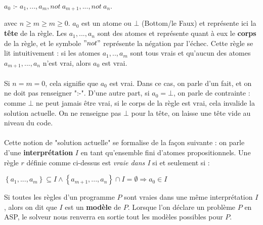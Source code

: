 \documentclass[12pt,a4paper]{article}
\begin{document}
\begin{center}
$a_0$ :- $a_1,...,a_m,not \: a_{m+1},...,not \: a_n.$
\end{center}
avec $n\geq m\geq m\geq 0$. $a_0$ est un atome ou $\bot$ (Bottom/le Faux) et représente ici la \textbf{tête} de la règle. Les $a_1,...,a_n$ sont des atomes et représente quant à eux le \textbf{corps} de la règle, et le symbole $"not"$ 
représente la négation par l'échec. Cette règle se lit intuitivement : si les atomes $a_1,..,a_m$ sont tous vrais et qu'aucun des atomes $a_{m+1},...,a_n$ n'est vrai, alors $a_0$ est vrai.\\ \\
Si $n=m=0$, cela signifie que $a_0$ est vrai. Dans ce cas, on parle d'un fait, et on ne doit pas renseigner ":-". D'une autre part, si $a_0=\bot$, on parle de contrainte : comme $\bot$ ne peut jamais être vrai, si le corps de la règle est vrai, cela 
invalide la solution actuelle. On ne renseigne pas $\bot$ pour la tête, on laisse une tête vide au niveau du code.\\ \\
Cette notion de "solution actuelle" se formalise de la façon suivante : on parle d'une \textbf{interprétation} $I$ en tant qu'ensemble fini d'atomes propositionnels. Une règle $r$ définie comme ci-dessus est \emph{vraie dans I} si et seulement si :

\begin{center}
$\left\{a_1,...,a_m\right\}\subseteq I \wedge \left\{a_{m+1},...,a_n\right\} \cap I = \emptyset \Rightarrow a_0 \in I$
\end{center}

Si toutes les règles d'un programme $P$ sont vraies dans une même interprétation $I$, alors on dit que $I$ est un \textbf{modèle} de $P$. Lorsque l'on déclare un problème $P$ en ASP, le solveur nous renverra en sortie tout 
les modèles possibles pour $P$.
\end{document}
